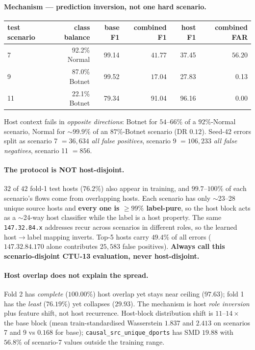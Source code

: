 \paragraph{Mechanism --- prediction inversion, not one hard scenario.}
\begin{center}\small
\begin{tabular}{lrrrrr}\toprule
test scenario & class balance & base F1 & combined F1 & host F1 & combined FAR \\\midrule
7  & 92.2\% Normal & 99.14 & $\mathbf{41.77}$ & 37.45 & $\mathbf{56.20}$ \\
9  & 87.0\% Botnet & 99.52 & $\mathbf{17.04}$ & 27.83 & 0.13 \\
11 & 22.1\% Botnet & 79.34 & 91.04 & 96.16 & 0.00 \\
\bottomrule\end{tabular}\end{center}
Host context fails in \emph{opposite directions}: Botnet for $54$--$66\%$ of a
$92\%$-Normal scenario, Normal for $\sim99.9\%$ of an $87\%$-Botnet scenario (DR $0.12$).
Seed-42 errors split as scenario 7 $=36{,}634$ \emph{all false positives}, scenario 9
$=106{,}233$ \emph{all false negatives}, scenario 11 $=856$.

\paragraph{$\!$The protocol is NOT host-disjoint.} $32$ of $42$ fold-1 test hosts
($76.2\%$) also appear in training, and $99.7$--$100\%$ of each scenario's flows come from
overlapping hosts. Each scenario has only $\sim$23--28 unique source hosts and
\textbf{every one is $\geq99\%$ label-pure}, so the host block acts as a $\sim$24-way host
classifier while the label is a host property. The same \texttt{147.32.84.x} addresses
recur across scenarios in different roles, so the learned host$\rightarrow$label mapping
inverts. Top-5 hosts carry $49.4\%$ of all errors ($147.32.84.170$ alone contributes
$25{,}583$ false positives). \textbf{Always call this scenario-disjoint CTU-13
evaluation, never host-disjoint.}

\paragraph{Host overlap does not explain the spread.} Fold 2 has \emph{complete}
($100.00\%$) host overlap yet stays near ceiling ($97.63$); fold 1 has the \emph{least}
($76.19\%$) yet collapses ($29.93$). The mechanism is host \emph{role inversion} plus
feature shift, not host recurrence. Host-block distribution shift is $11$--$14\times$ the
base block (mean train-standardised Wasserstein $1.837$ and $2.413$ on scenarios 7 and 9
vs $0.168$ for base); \texttt{causal\_src\_unique\_dports} has SMD $19.88$ with $56.8\%$
of scenario-7 values outside the training range.

